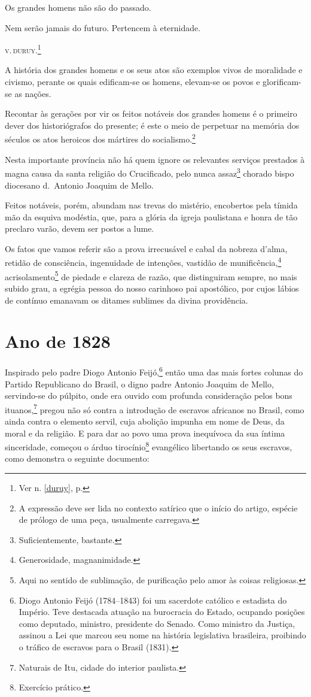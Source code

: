 Os grandes homens não são do passado.

Nem serão jamais do futuro. Pertencem à eternidade.

\textsc{v.\,duruy}.\footnote{Ver n. \ref{duruy}, p. \pageref{duruy}}

A história dos grandes homens e os seus atos são exemplos vivos de
moralidade e civismo, perante os quais edificam-se os homens, elevam-se
os povos e glorificam-se as nações.

Recontar às gerações por vir os feitos notáveis dos grandes homens é o
primeiro dever dos historiógrafos do presente; é este o meio de
perpetuar na memória dos séculos os atos heroicos dos mártires do
socialismo.\footnote{A expressão deve ser lida no contexto satírico
  que o início do artigo, espécie de prólogo de uma peça, usualmente
  carregava.}

Nesta importante província não há quem ignore os relevantes serviços
prestados à magna causa da santa religião do Crucificado, pelo nunca
assaz\footnote{Suficientemente, bastante.} chorado bispo diocesano
d.~Antonio Joaquim de Mello.

Feitos notáveis, porém, abundam nas trevas do mistério, encobertos pela
tímida mão da esquiva modéstia, que, para a glória da igreja paulistana
e honra de tão preclaro varão, devem ser postos a lume.

Os fatos que vamos referir são a prova irrecusável e cabal da nobreza
d'alma, retidão de consciência, ingenuidade de intenções, vastidão de
munificência,\footnote{Generosidade, magnanimidade.}
acrisolamento\footnote{Aqui no sentido de sublimação, de purificação
  pelo amor às coisas religiosas.} de piedade e clareza de razão, que
distinguiram sempre, no mais subido grau, a egrégia pessoa do nosso
carinhoso pai apostólico, por cujos lábios de contínuo emanavam os
ditames sublimes da divina providência.

\section{Ano de 1828}

Inspirado pelo padre Diogo Antonio Feijó,\footnote{Diogo Antonio Feijó
  (1784--1843) foi um sacerdote católico e estadista do Império. Teve
  destacada atuação na burocracia do Estado, ocupando posições como
  deputado, ministro, presidente do Senado. Como ministro da Justiça,
  assinou a Lei que marcou seu nome na história legislativa brasileira,
  proibindo o tráfico de escravos para o Brasil (1831).} então uma das
mais fortes colunas do Partido Republicano do Brasil, o digno padre
Antonio Joaquim de Mello, servindo-se do púlpito, onde era ouvido com
profunda consideração pelos bons ituanos,\footnote{Naturais de Itu,
  cidade do interior paulista.} pregou não só contra a introdução de
escravos africanos no Brasil, como ainda contra o elemento servil, cuja
abolição impunha em nome de Deus, da moral e da religião. E para dar ao
povo uma prova inequívoca da sua íntima sinceridade, começou o árduo
tirocínio\footnote{Exercício prático.} evangélico libertando os seus
escravos, como demonstra o seguinte documento:


